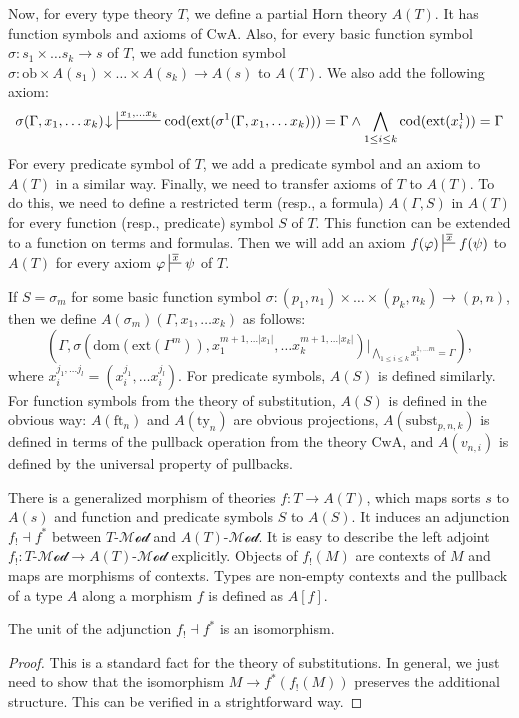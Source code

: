 \documentclass[reqno]{amsart}
\theoremstyle{definition}
\theoremstyle{remark}
\newcommand{\fs}[1]{\mathrm{#1}}
\newcommand{\cat}[1]{\mathcal{#1}}
\newcommand{\Mod}[1]{#1\text{-}\cat{Mod}}
\numberwithin{figure}{section}
\begin{document}
Now, for every type theory $T$, we define a partial Horn theory $A(T)$.
It has function symbols and axioms of $\fs{CwA}$.
Also, for every basic function symbol $\sigma : s_1 \times \ldots s_k \to s$ of $T$, we add function symbol $\sigma : \fs{ob} \times A(s_1) \times \ldots \times A(s_k) \to A(s)$ to $A(T)$.
We also add the following axiom:
\[ \sigma(\Gamma, x_1, \ldots x_k)\!\downarrow\ \sststile{}{x_1, \ldots x_k} \fs{cod}(\fs{ext}(\sigma^1(\Gamma, x_1, \ldots x_k))) = \Gamma \land \bigwedge_{1 \leq i \leq k} \fs{cod}(\fs{ext}(x_i^1)) = \Gamma \]
For every predicate symbol of $T$, we add a predicate symbol and an axiom to $A(T)$ in a similar way.
Finally, we need to transfer axioms of $T$ to $A(T)$.
To do this, we need to define a restricted term (resp., a formula) $A(\Gamma,S)$ in $A(T)$ for every function (resp., predicate) symbol $S$ of $T$.
This function can be extended to a function on terms and formulas.
Then we will add an axiom $f(\varphi) \sststile{}{\overline{x}} f(\psi)$ to $A(T)$ for every axiom $\varphi \sststile{}{\overline{x}} \psi$ of $T$.

If $S = \sigma_m$ for some basic function symbol $\sigma : (p_1,n_1) \times \ldots \times (p_k,n_k) \to (p,n)$, then we define $A(\sigma_m)(\Gamma, x_1, \ldots x_k)$ as follows:
\[ (\Gamma, \sigma(\fs{dom}(\fs{ext}(\Gamma^m)), x_1^{m+1, \ldots |x_1|}, \ldots x_k^{m+1, \ldots |x_k|})|_{\bigwedge_{1 \leq i \leq k} x_i^{1, \ldots m} = \Gamma}), \]
where $x_i^{j_1, \ldots j_l} = (x_i^{j_1}, \ldots x_i^{j_l})$.
For predicate symbols, $A(S)$ is defined similarly.
For function symbols from the theory of substitution, $A(S)$ is defined in the obvious way: $A(\fs{ft}_n)$ and $A(\fs{ty}_n)$ are obvious projections,
$A(\fs{subst}_{p,n,k})$ is defined in terms of the pullback operation from the theory $\fs{CwA}$, and $A(v_{n,i})$ is defined by the universal property of pullbacks.

There is a generalized morphism of theories $f : T \to A(T)$, which maps sorts $s$ to $A(s)$ and function and predicate symbols $S$ to $A(S)$.
It induces an adjunction $f_! \dashv f^*$ between $\Mod{T}$ and $\Mod{A(T)}$.
It is easy to describe the left adjoint $f_! : \Mod{T} \to \Mod{A(T)}$ explicitly.
Objects of $f_!(M)$ are contexts of $M$ and maps are morphisms of contexts.
Types are non-empty contexts and the pullback of a type $A$ along a morphism $f$ is defined as $A[f]$.

\begin{prop}
The unit of the adjunction $f_! \dashv f^*$ is an isomorphism.
\end{prop}
\begin{proof}
This is a standard fact for the theory of substitutions.
In general, we just need to show that the isomorphism $M \to f^*(f_!(M))$ preserves the additional structure.
This can be verified in a strightforward way.
\end{proof}
\end{document}

